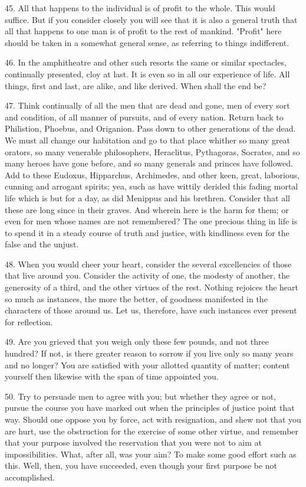 \documentclass{book}
\begin{document}
45. All that happens to the individual is of profit to the whole. This
would suffice. But if you consider closely you will see that it is
also a general truth that all that happens to one man is of profit to
the rest of mankind. "Profit" here should be taken in a somewhat
general sense, as referring to things indifferent.

46. In the amphitheatre and other such resorts the same or similar
spectacles, continually presented, cloy at last. It is even so in all
our experience of life. All things, first and last, are alike, and
like derived. When shall the end be?

47. Think continually of all the men that are dead and gone, men of
every sort and condition, of all manner of pursuits, and of every
nation. Return back to Philistion, Phoebus, and Origanion. Pass down
to other generations of the dead. We must all change our habitation
and go to that place whither so many great orators, so many venerable
philosophers, Heraclitus, Pythagoras, Socrates, and so many heroes
have gone before, and so many generals and princes have followed. Add
to these Eudoxus, Hipparchus, Archimedes, and other keen, great,
laborious, cunning and arrogant spirits; yea, such as have wittily
derided this fading mortal life which is but for a day, as did
Menippus and his brethren. Consider that all these are long since in
their graves. And wherein here is the harm for them; or even for men
whose names are not remembered? The one precious thing in life is to
spend it in a steady course of truth and justice, with kindliness even
for the false and the unjust.

48. When you would cheer your heart, consider the several excellencies
of those that live around you. Consider the activity of one, the
modesty of another, the generosity of a third, and the other virtues
of the rest. Nothing rejoices the heart so much as instances, the more
the better, of goodness manifested in the characters of those around
us. Let us, therefore, have such instances ever present for
reflection.

49. Are you grieved that you weigh only these few pounds, and not
three hundred? If not, is there greater reason to sorrow if you live
only so many years and no longer? You are satisfied with your allotted
quantity of matter; content yourself then likewise with the span of
time appointed you.

50. Try to persuade men to agree with you; but whether they agree or
not, pursue the course you have marked out when the principles of
justice point that way. Should one oppose you by force, act with
resignation, and shew not that you are hurt, use the obstruction for
the exercise of some other virtue, and remember that your purpose
involved the reservation that you were not to aim at impossibilities.
What, after all, was your aim? To make some good effort such as
this. Well, then, you have succeeded, even though your first purpose
be not accomplished.
\end{document}
